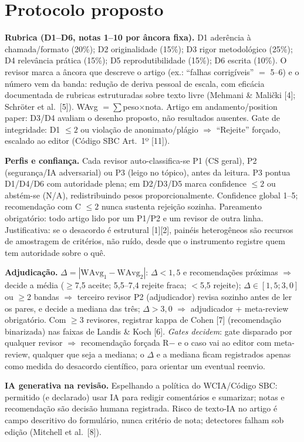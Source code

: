 \documentclass[10pt,a4paper,twocolumn]{article}
\begin{document}
\section{Protocolo proposto}

\textbf{Rubrica (D1--D6, notas 1--10 por âncora fixa).} D1 aderência à chamada/formato (20\%); D2 originalidade (15\%); D3 rigor metodológico (25\%); D4 relevância prática (15\%); D5 reprodutibilidade (15\%); D6 escrita (10\%). O revisor marca a âncora que descreve o artigo (ex.: ``falhas corrigíveis'' $=$ 5--6) e o número vem da banda: redução de deriva pessoal de escala, com eficácia documentada de rubricas estruturadas sobre texto livre (Mehmani \& Malički [4]; Schröter et al.\ [5]). WAvg $= \sum$peso$\times$nota. Artigo em andamento/position paper: D3/D4 avaliam o desenho proposto, não resultados ausentes. Gate de integridade: D1 $\leq 2$ ou violação de anonimato/plágio $\Rightarrow$ ``Rejeite'' forçado, escalado ao editor (Código SBC Art.\ 1º [11]).

\textbf{Perfis e confiança.} Cada revisor auto-classifica-se P1 (CS geral), P2 (segurança/IA adversarial) ou P3 (leigo no tópico), antes da leitura. P3 pontua D1/D4/D6 com autoridade plena; em D2/D3/D5 marca confidence $\leq 2$ ou abstém-se (N/A), redistribuindo pesos proporcionalmente. Confidence global 1--5; recomendação com C $\leq 2$ nunca sustenta rejeição sozinha. Pareamento obrigatório: todo artigo lido por um P1/P2 e um revisor de outra linha. Justificativa: se o desacordo é estrutural [1][2], painéis heterogêneos são recursos de amostragem de critérios, não ruído, desde que o instrumento registre quem tem autoridade sobre o quê.

\textbf{Adjudicação.} $\Delta = |\mathrm{WAvg}_1 - \mathrm{WAvg}_2|$: $\Delta < 1{,}5$ e recomendações próximas $\Rightarrow$ decide a média ($\geq$7,5 aceite; 5,5--7,4 rejeite fraca; $<$5,5 rejeite); $\Delta \in [1{,}5; 3{,}0]$ ou $\geq$2 bandas $\Rightarrow$ terceiro revisor P2 (adjudicador) revisa sozinho antes de ler os pares, e decide a mediana das três; $\Delta > 3{,}0$ $\Rightarrow$ adjudicador + meta-review obrigatório. Com $\geq$3 revisores, registrar kappa de Cohen [7] (recomendação binarizada) nas faixas de Landis \& Koch [6]. \emph{Gates decidem}: gate disparado por qualquer revisor $\Rightarrow$ recomendação forçada R$-$ e o caso vai ao editor com meta-review, qualquer que seja a mediana; o $\Delta$ e a mediana ficam registrados apenas como medida do desacordo científico, para orientar um eventual reenvio.

\textbf{IA generativa na revisão.} Espelhando a política do WCIA/Código SBC: permitido (e declarado) usar IA para redigir comentários e sumarizar; notas e recomendação são decisão humana registrada. Risco de texto-IA no artigo é campo descritivo do formulário, nunca critério de nota; detectores falham sob edição (Mitchell et al.\ [8]).
\end{document}
